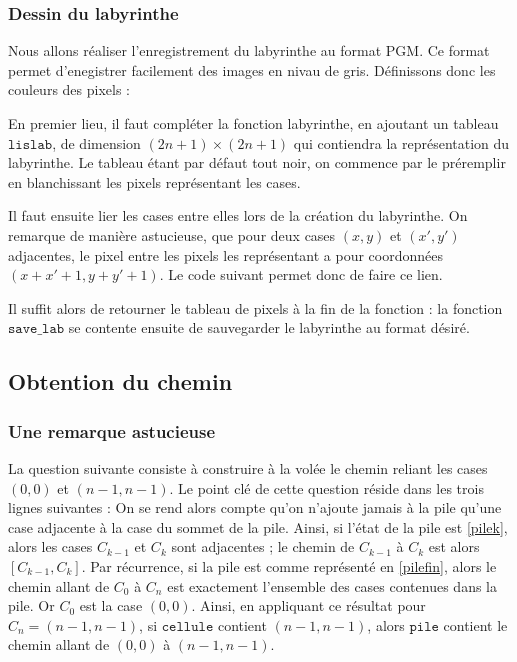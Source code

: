 \documentclass[11pt,a4paper]{article}
\begin{document}
\subsubsection{Dessin du labyrinthe}

Nous allons réaliser l'enregistrement du labyrinthe au format PGM. Ce format permet d'enegistrer facilement des images en nivau de gris. Définissons donc les couleurs des pixels :

%

\par
En premier lieu, il faut compléter la fonction labyrinthe, en ajoutant un tableau $\mathtt{lislab}$, de dimension $(2n+1) \times (2n+1)$ qui contiendra la représentation du labyrinthe. Le tableau étant par défaut tout noir, on commence par le préremplir en blanchissant les pixels représentant les cases.

%

Il faut ensuite lier les cases entre elles lors de la création du labyrinthe. On remarque de manière astucieuse, que pour deux cases $(x,y)$ et $(x',y')$ adjacentes, le pixel entre les pixels les représentant a pour coordonnées $(x+x'+1,y+y'+1)$. Le code suivant permet donc de faire ce lien.

%

Il suffit alors de retourner le tableau de pixels à la fin de la fonction : la fonction $\mathtt{save\_lab}$ se contente ensuite de sauvegarder le labyrinthe au format désiré.

%


\subsection{Obtention du chemin}

\subsubsection{Une remarque astucieuse}
La question suivante consiste à construire à la volée le chemin reliant les cases $(0,0)$ et $(n-1,n-1)$.  Le point clé de cette question réside dans les trois lignes suivantes :
%
On se rend alors compte qu'on n'ajoute jamais à la pile qu'une case adjacente à la case du sommet de la pile. Ainsi, si l'état de la pile est \ref{pilek}, alors les cases $C_{k-1}$ et $C_{k}$ sont adjacentes ; le chemin de $C_{k-1}$ à $C_{k}$ est alors $[C_{k-1},C_{k}]$. Par récurrence, si la pile est comme représenté en \ref{pilefin}, alors le chemin allant de $C_0$ à $C_n$ est exactement l'ensemble des cases contenues dans la pile. Or $C_0$ est la case $(0,0)$. Ainsi, en appliquant ce résultat pour $C_n = (n-1,n-1)$, si $\mathtt{cellule}$ contient $(n-1,n-1)$, alors $\mathtt{pile}$ contient le chemin allant de $(0,0)$ à $(n-1,n-1)$.
\end{document}
